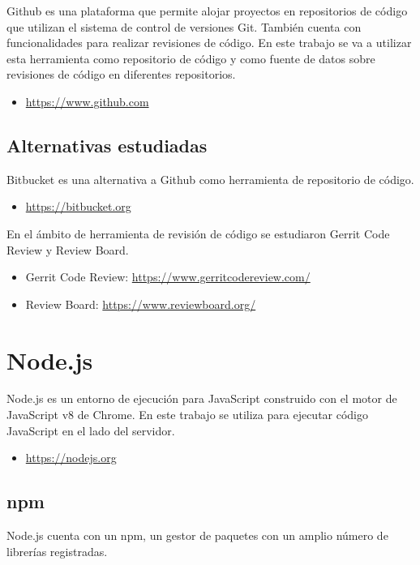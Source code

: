 Github es una plataforma que permite alojar proyectos en repositorios de código que utilizan el sistema de control de versiones Git. También cuenta con funcionalidades para realizar revisiones de código. En este trabajo se va a utilizar esta herramienta como repositorio de código y como fuente de datos sobre revisiones de código en diferentes repositorios.

\begin{itemize}
	\item \url{https://www.github.com}
\end{itemize}

\subsection{Alternativas estudiadas}

Bitbucket es una alternativa a Github como herramienta de repositorio de código.

\begin{itemize}
	\item \url{https://bitbucket.org}
\end{itemize}

En el ámbito de herramienta de revisión de código se estudiaron Gerrit Code Review y Review Board.

\begin{itemize}
	\item Gerrit Code Review: \url{https://www.gerritcodereview.com/}
	\item Review Board: \url{https://www.reviewboard.org/}
\end{itemize}

\section{Node.js}

Node.js es un entorno de ejecución para JavaScript construido con el motor de JavaScript v8 de Chrome. En este trabajo se utiliza para ejecutar código JavaScript en el lado del servidor.

\begin{itemize}
	\item \url{https://nodejs.org}
\end{itemize}

\subsection{npm}

Node.js cuenta con un npm, un gestor de paquetes con un amplio número de librerías registradas.

